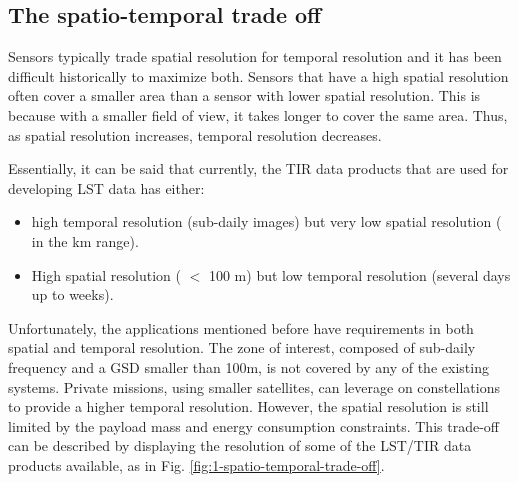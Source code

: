     \subsection{The spatio-temporal trade off}

        Sensors typically trade spatial resolution for temporal resolution and  it has been difficult historically to maximize both.
        Sensors that have a high spatial resolution often cover a smaller area than a sensor with lower spatial resolution.
        This is because with a smaller field of view, it takes longer to cover the same area. Thus, as spatial resolution increases, temporal resolution decreases.

        Essentially, it can be said that currently, the TIR data products that are used for developing LST data has either: 
        
        \begin{itemize}
            \item high temporal resolution (sub-daily images) but very low spatial resolution ( in the km range).
            \item High spatial resolution ( $<$ 100 m) but low temporal resolution (several days up to weeks).
        \end{itemize}

        Unfortunately, the applications mentioned before have requirements in both spatial and temporal resolution. 
        The zone of interest, composed of sub-daily frequency and a GSD smaller than 100m, is not covered by any of the existing systems.
        Private missions, using smaller satellites, can leverage on constellations  to provide a higher temporal resolution.
        However, the spatial resolution is still limited by the payload mass and energy consumption constraints.
        This trade-off can be described by displaying the resolution of some of the LST/TIR data products available, as in Fig. \ref{fig:1-spatio-temporal-trade-off}. 

